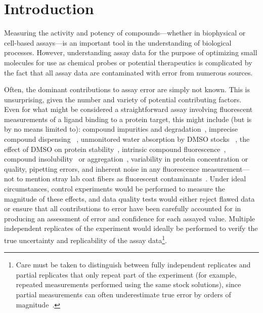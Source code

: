 \documentclass[aps,pre,twocolumn,nofootinbib,superscriptaddress,linenumbers]{revtex4-1}
\begin{document}
\section{Introduction}
\label{section:introduction}

Measuring the activity and potency of compounds---whether in biophysical or cell-based assays---is an important tool in the understanding of biological processes.
However, understanding assay data for the purpose of optimizing small molecules for use as chemical probes or potential therapeutics is complicated by the fact that all assay data are contaminated with error from numerous sources.

Often, the dominant contributions to assay error are simply not known.
This is unsurprising, given the number and variety of potential contributing factors.
Even for what might be considered a straightforward assay involving fluorescent measurements of a ligand binding to a protein target, this might include (but is by no means limited to): compound impurities and degradation~\cite{kozikowski_effect_2003,kozikowski_effect_2003-1,cheng_studies_2003,waybright_overcoming_2009}, imprecise compound dispensing  ~\cite{harris_gradient_2010,grant_achieving_2009}, unmonitored water absorption by DMSO stocks ~\cite{waybright_overcoming_2009}, the effect of DMSO on protein stability~\cite{tjernberg_dmso-related_2005}, intrinsic compound fluorescence~\cite{simeonov_fluorescence_2008,baell_new_2010}, compound insolubility~\cite{di_biological_2006} or aggregation~\cite{mcgovern_common_2002,mcgovern_kinase_2003,feng_high-throughput_2005,feng_synergy_2006,baell_new_2010}, variability in protein concentration or quality, pipetting errors, and inherent noise in any fluorescence measurement---not to mention stray lab coat fibers as fluorescent contaminants~\cite{busch_does_2015}. 
Under ideal circumstances, control experiments would be performed to measure the magnitude of these effects, and data quality tests would either reject flawed data or ensure that all contributions to error have been carefully accounted for in producing an assessment of error and confidence for each assayed value.
Multiple independent replicates of the experiment would ideally be performed to verify the true uncertainty and replicability of the assay data\footnote{Care must be taken to distinguish between fully independent replicates and partial replicates that only repeat part of the experiment (for example, repeated measurements performed using the same stock solutions), since partial measurements can often underestimate true error by orders of magnitude~\cite{chodera_entropy-enthalpy_2013}.}.
\end{document}
